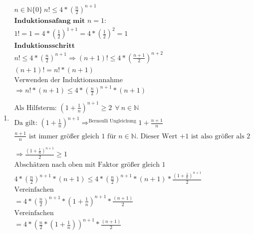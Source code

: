 \documentclass{article}
\begin{document}
\begin{enumerate}[label = (\alph*)]
            \item
                \begin{gather*}
                    n \in \mathbb{N}\{0\} \: n! \leq 4 * { \left( \frac{n}{2} \right) }^{n+1} \\
                    \textbf{Induktionsafang mit } n=1: \\
                    1! = 1 = 4 * {\left( \frac{1}{2} \right) }^{1+1} = 4 * {\left( \frac{1}{2} \right)}^{2} = 1 \\
                    \textbf{Induktionsschritt} \\
                    n! \leq 4 * {\left( \frac{n}{2} \right) }^{n+1} \Rightarrow (n+1)! \leq 4 * {\left( \frac{n+1}{2} \right) }^{n+2} \\
                    (n+1)! = n! * (n+1) \\
                    \text{Verwenden der Induktionsannahme} \\
                    \Rightarrow n! * (n+1) \leq 4 * {\left( \frac{n}{2} \right) }^{n+1} * (n + 1) \\
                    \\
                    \text{Als Hilfsterm: } {(1 + \frac{1}{n})}^{n+1} \geq 2 \: \: \forall \: n \in \mathbb{N} \\
                    \text{Da gilt: }
                    {(1 + \frac{1}{n})}^{n+1} \Rightarrow^\text{Bernoulli Ungleichung} 1 + \frac{n+1}{n}\\
                    \frac{n+1}{n} \text{ ist immer größer gleich 1 für } n \in \mathbb{N} \text{. Dieser Wert +1 ist also größer als 2} \\
                    \\
                    \Rightarrow \frac{{(1 + \frac{1}{n})}^{n+1}}{2} \geq 1 \\
                    \text{Abschätzen nach oben mit Faktor größer gleich 1} \\
                    4 * {\left( \frac{n}{2} \right) }^{n+1} * (n + 1) \leq  4 * {\left( \frac{n}{2} \right) }^{n+1} * (n + 1) * \frac{{(1 + \frac{1}{n})}^{n+1}}{2} \\
                    \text{Vereinfachen} \\
                    = 4 * {\left( \frac{n}{2} \right) }^{n+1} * {(1 + \frac{1}{n})}^{n+1} * \frac{(n + 1)}{2} \\
                    \text{Vereinfachen} \\
                    = 4 * {\left( \frac{n}{2} * {(1 + \frac{1}{n})} \right)}^{n+1} * \frac{(n + 1)}{2} \\

\end{gather*}
\end{enumerate}
\end{document}
